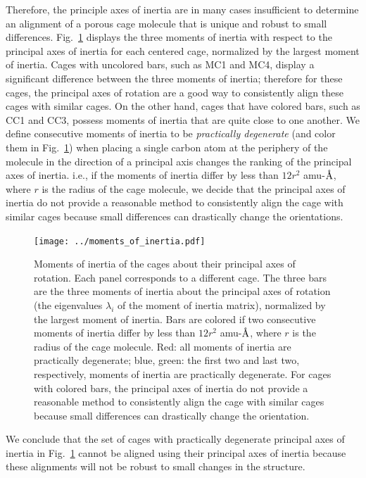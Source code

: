 \documentclass[journal=jacsat,manuscript=article]{achemso}
\newcommand{\angstrom}{\mbox{\normalfont\AA}}
\begin{document}
{Therefore, the principle axes of inertia are in many cases insufficient to determine an alignment of a porous cage molecule that is unique and robust to small differences. Fig.~\ref{fig:moments_of_inertia} displays the three moments of inertia with respect to the principal axes of inertia for each centered cage, normalized by the largest moment of inertia. Cages with uncolored bars, such as MC1 and MC4, display a significant difference between the three moments of inertia; therefore for these cages, the  principal axes of rotation are a good way to consistently align these cages with similar cages. On the other hand, cages that have colored bars, such as CC1 and CC3, possess moments of inertia that are quite close to one another. We define consecutive moments of inertia to be \emph{practically degenerate} (and color them in Fig.~\ref{fig:moments_of_inertia}) when placing a single carbon atom at the periphery of the molecule in the direction of a principal axis changes the ranking of the principal axes of inertia. i.e., if the moments of inertia differ by less than $12 r^2$ amu-$\angstrom$, where $r$ is the radius of the cage molecule, we decide that the principal axes of inertia do not provide a reasonable method to consistently align the cage with similar cages because small differences can drastically change the orientations.

\begin{figure}
\centering
\texttt{[image: ../moments\_of\_inertia.pdf]}
	\caption{{\color{red} Moments of inertia of the cages about their principal axes of rotation. Each panel corresponds to a different cage. The three bars are the three moments of inertia about the principal axes of rotation (the eigenvalues $\lambda_i$ of the moment of inertia matrix), normalized by the largest moment of inertia. Bars are colored if two consecutive moments of inertia differ by less than $12 r^2$ amu-$\angstrom$, where $r$ is the radius of the cage molecule. Red: all moments of inertia are practically degenerate; blue, green: the first two and last two, respectively, moments of inertia are practically degenerate. For cages with colored bars, the principal axes of inertia do not provide a reasonable method to consistently align the cage with similar cages because small differences can drastically change the orientation.
	}%
	} \label{fig:moments_of_inertia}
\end{figure}

We conclude that the set of cages with practically degenerate principal axes of inertia in Fig.~\ref{fig:moments_of_inertia} cannot be aligned using their principal axes of inertia because these alignments will not be robust to small changes in the structure.


} %
\end{document}
